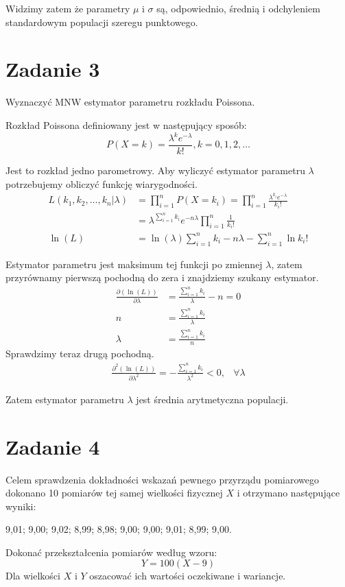 \documentclass{article}
\begin{document}
Widzimy zatem że parametry $\mu$ i $\sigma$ są, odpowiednio, średnią i odchyleniem standardowym populacji szeregu punktowego.

\newpage
\section{Zadanie 3}
Wyznaczyć MNW estymator parametru rozkładu Poissona. \\ \par

Rozkład Poissona definiowany jest w następujący sposób:
\[ P(X = k) = \frac{\lambda^k e^{-\lambda}}{k!}, k = 0,1,2,\dots \]

Jest to rozkład jedno parometrowy. Aby wyliczyć estymator parametru $\lambda$ potrzebujemy obliczyć funkcję wiarygodności.
\begin{align*}
L(k_1,k_2,\dots,k_n|\lambda) & = \prod_{i=1}^n P(X = k_i) = \prod_{i=1}^n \frac{\lambda^{k_i} e^{-\lambda}}{k_i!} \\
& = \lambda^{\sum_{i=1}^n k_i} e^{-n\lambda} \prod_{i=1}^n \frac{1}{k_i!} \\
\ln(L) & = \ln(\lambda)\sum_{i=1}^n k_i - n\lambda - \sum_{i=1}^n \ln{k_i!}
\end{align*}

Estymator parametru jest maksimum tej funkcji po zmiennej $\lambda$, zatem przyrównamy pierwszą pochodną do zera i znajdziemy szukany estymator.
\begin{align*}
\frac{\partial(\ln(L))}{\partial\lambda} & = \frac{\sum_{i=1}^n k_i}{\lambda} - n = 0 \\
n & = \frac{\sum_{i=1}^n k_i}{\lambda} \\
\lambda & = \frac{\sum_{i=1}^n k_i}{n}
\end{align*}
Sprawdzimy teraz drugą pochodną.
\[ \begin{array}{cr} \frac{\partial^2(\ln(L))}{\partial\lambda^2} = -\frac{\sum_{i=1}^n k_i}{\lambda^2} < 0, & \forall \lambda \end{array} \]

Zatem estymator parametru $\lambda$ jest średnia arytmetyczna populacji.

\newpage
\section{Zadanie 4}
Celem sprawdzenia dokładności wskazań pewnego przyrządu pomiarowego dokonano 10
pomiarów tej samej wielkości fizycznej $X$ i otrzymano następujące wyniki: \\
\begin{center}
9,01; 9,00; 9,02; 8,99; 8,98; 9,00; 9,00; 9,01; 8,99; 9,00.
\end{center}
Dokonać przekształcenia pomiarów według wzoru:
\[ Y = 100(X - 9) \]
Dla wielkości $X$ i $Y$ oszacować ich wartości oczekiwane i wariancje. \\ \par
\end{document}
